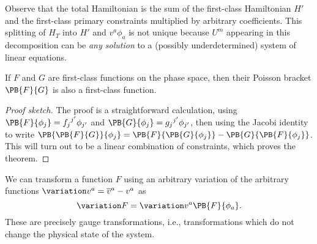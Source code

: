 \M Observe that the total Hamiltonian is the sum of the first-class
Hamiltonian $H'$ and the first-class primary constraints multiplied by
arbitrary coefficients. This splitting of $H_{T}$ into $H'$ and
$v^{a}\phi_{a}$ is not unique because $U^{m}$ appearing in this
decomposition can be \emph{any solution} to a (possibly underdetermined)
system of linear equations.

\begin{theorem}
If $F$ and $G$ are first-class functions on the phase space, then their
Poisson bracket $\PB{F}{G}$ is also a first-class function.
\end{theorem}

\begin{proof}[Proof sketch]
The proof is a straightforward calculation, using
$\PB{F}{\phi_{j}}={f_{j}}^{j'}\phi_{j'}$
and
$\PB{G}{\phi_{j}}={g_{j}}^{j'}\phi_{j'}$, then using the Jacobi identity
to write $\PB{\PB{F}{G}}{\phi_{j}}=\PB{F}{\PB{G}{\phi_{j}}}-\PB{G}{\PB{F}{\phi_{j}}}$.
This will turn out to be a linear combination of constraints, which
proves the theorem.
\end{proof}

We can transform a function $F$ using an arbitrary variation of the
arbitrary functions $\variation v^{a}=\overline{v}^{a}-v^{a}$ as
\begin{equation}
\variation F = \variation v^{a}\PB{F}{\phi_{a}}.
\end{equation}
These are precisely gauge transformations, i.e., transformations which
do not change the physical state of the system.
